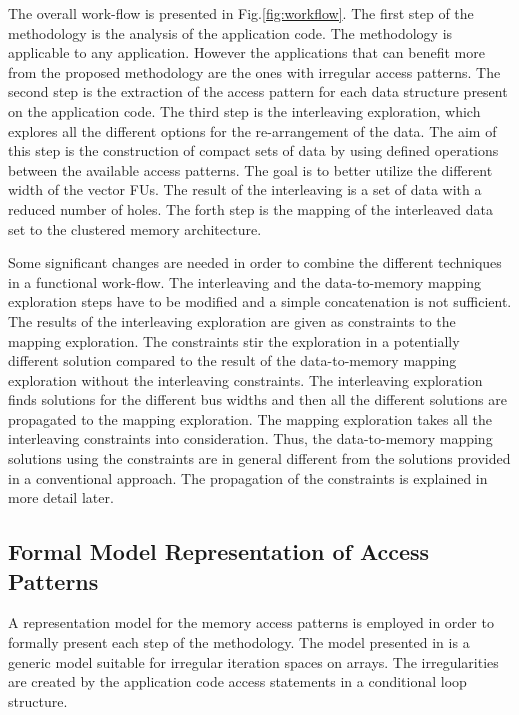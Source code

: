 The overall work-flow is presented in Fig.\ref{fig:workflow}. 
The first step of the methodology is the analysis of the application code. 
The methodology is applicable to any application.
However the applications that can benefit more from the proposed methodology are the ones with irregular access patterns.
The second step is the extraction of the access pattern for each data structure present on the application code.
The third step is the interleaving exploration, which explores all the different options for the re-arrangement of the data.
The aim of this step is the construction of compact sets of data by using defined operations between the available access patterns.
The goal is to better utilize the different width of the vector FUs. 
The result of the interleaving is a set of data with a reduced number of holes.
The forth step is the mapping of the interleaved data set to the clustered memory architecture.

Some significant changes are needed in order to combine the different techniques in a functional work-flow.
The interleaving and the data-to-memory mapping exploration steps have to be modified and a simple concatenation is not sufficient.
The results of the interleaving exploration are given as constraints to the mapping exploration.
The constraints stir the exploration in a potentially different solution compared to the result of the data-to-memory mapping exploration without the interleaving constraints.
The interleaving exploration finds solutions for the different bus widths and then all the different solutions are propagated to the mapping exploration.
The mapping exploration takes all the interleaving constraints into consideration.
Thus, the data-to-memory mapping solutions using the constraints are in general different from the solutions provided in a conventional approach.
The propagation of the constraints is explained in more detail later. 

\subsection{Formal Model Representation of Access Patterns }

A representation model for the memory access patterns is employed in order to formally present each step of the methodology.
The model presented in \cite{Ang13} is a generic model suitable for irregular iteration spaces on arrays.
The irregularities are created by the application code access statements in a conditional loop structure.

